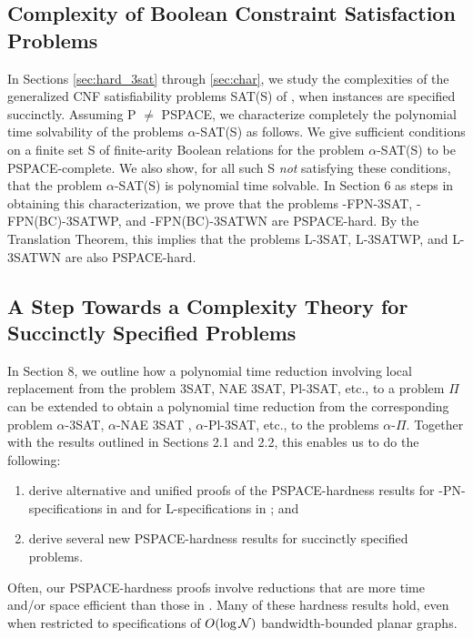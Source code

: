 \vspace*{-0.15in}
\subsection{Complexity of Boolean Constraint Satisfaction Problems}\label{sec:sat}
In Sections \ref{sec:hard_3sat} through \ref{sec:char}, we study the complexities 
of the 
 generalized {\sf CNF}  satisfiability problems {\sf SAT(S)} of \cite{Sc78},
when instances are specified succinctly.
Assuming {\sf P} $\neq$ {\sf PSPACE}, we characterize completely 
the polynomial time solvability of the problems  $\alpha$-{\sf SAT(S)} as follows. We give sufficient conditions on a finite set {\sf S} of finite-arity 
Boolean relations for the problem  $\alpha$-{\sf SAT(S)} to be 
{\sf PSPACE-}complete. We also show, for all such {\sf S} {\em not}
 satisfying 
these conditions, that the problem $\alpha$-{\sf SAT(S)} is polynomial 
time solvable. In Section 6 as steps in obtaining this characterization,
we prove that the problems {-FPN-3SAT}, {-FPN(BC)-3SATWP}, and 
{-FPN(BC)-3SATWN} are {\sf PSPACE-}hard. By the Translation
Theorem, this implies that the problems {\sf L-3SAT}, {\sf L-3SATWP},
and {\sf L-3SATWN} are also {\sf PSPACE-}hard.

\vspace*{-0.15in}
\subsection{A Step Towards a Complexity Theory for Succinctly Specified 
Problems}
In Section 8, we outline how a polynomial time reduction involving
local replacement \cite{GJ79} from the problem 
{\sf 3SAT, NAE 3SAT, Pl-3SAT,} etc., to a problem $\Pi$ can be extended
to obtain a polynomial time reduction from the corresponding problem 
$\alpha$-{\sf 3SAT}, $\alpha$-{\sf NAE 3SAT} ,
 $\alpha$-{\sf Pl-3SAT}, etc., to the problems
 $\alpha$-$\Pi$. Together with the results outlined in 
Sections 2.1 and 2.2, this enables us to do the following:
\begin{enumerate}
\item derive alternative and unified proofs of the {\sf PSPACE-}hardness 
results for {-PN-} specifications in \cite{Or82a} and for
 {\sf L-}specifications in \cite{LW92}; and 
\item derive several new {\sf PSPACE-}hardness results for succinctly 
specified problems. 
\end{enumerate}

Often, our {\sf PSPACE-}hardness  proofs involve 
reductions that are more time and/or space efficient than those in 
\cite{Or82a,LW92}. Many of these hardness results hold, even when 
restricted to specifications of $O(\log {\cal N})$ 
bandwidth-bounded planar graphs.
 



